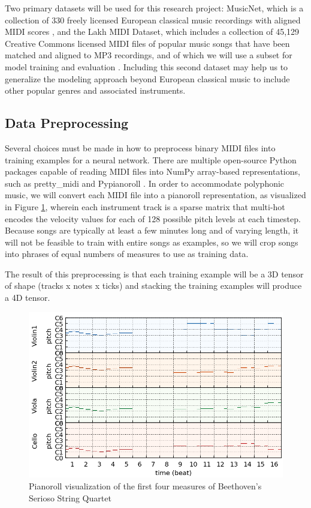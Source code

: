 \documentclass[sigconf,authorversion]{acmart}
\begin{document}
Two primary datasets will be used for this research project: MusicNet,
which is a collection of 330 freely licensed European classical music
recordings with aligned MIDI scores \cite{thickstun2017learning}, and
the Lakh MIDI Dataset, which includes a collection of 45,129 Creative
Commons licensed MIDI files of popular music songs that have been
matched and aligned to MP3 recordings, and of which we will use a
subset for model training and evaluation
\cite{raffel_learning-based_2016}. Including this second dataset may
help us to generalize the modeling approach beyond European classical
music to include other popular genres and associated instruments.

\subsection{Data Preprocessing}

Several choices must be made in how to preprocess binary MIDI files
into training examples for a neural network. There are multiple
open-source Python packages capable of reading MIDI files into NumPy
array-based representations, such as pretty\_midi
\cite{raffel_pretty_midi_2014} and Pypianoroll
\cite{dong_pypianoroll_2018}. In order to accommodate polyphonic
music, we will convert each MIDI file into a pianoroll representation,
as visualized in Figure \ref{pianoroll}, wherein each instrument track
is a sparse matrix that multi-hot encodes the velocity values for each
of 128 possible pitch levels at each timestep. Because songs are
typically at least a few minutes long and of varying length, it will
not be feasible to train with entire songs as examples, so we will
crop songs into phrases of equal numbers of measures to use as
training data.

The result of this preprocessing is that each training example will be
a 3D tensor of shape (tracks x notes x ticks) and stacking the
training examples will produce a 4D tensor.

\begin{figure}[h]
  \centering
  \includegraphics[width=\linewidth]{first_four_bars.png}
  \caption{Pianoroll visualization of the first four measures of
    Beethoven's Serioso String Quartet}
  \label{pianoroll}
\end{figure}
\end{document}
